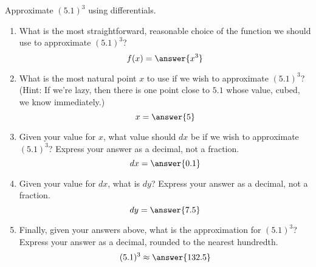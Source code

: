 \documentclass{ximera}
\author{Gregory Hartman \and Matthew Carr}
\begin{document}
\begin{exercise}




Approximate $(5.1)^3$ using differentials.
\begin{enumerate}
\item		What is the most straightforward, reasonable choice of the function we should use to approximate $(5.1)^3$?\[f(x)=\answer{x^3}\]
\item		What is the most natural point $x$ to use if we wish to approximate $(5.1)^3$? (Hint: If we're lazy, then there is one point close to $5.1$ whose value, cubed, we know immediately.) \[x=\answer{5}\]
\item		Given your value for $x$, what value should $dx$ be if we wish to approximate $(5.1)^3$? Express your answer as a decimal, not a fraction. \[dx=\answer{0.1}\]
\item		Given your value for $dx$, what is $dy$? Express your answer as a decimal, not a fraction. \[dy=\answer{7.5}\]
\item		Finally, given your answers above, what is the approximation for $(5.1)^3$? Express your answer as a decimal, rounded to the nearest hundredth. \[(5.1)^3\approx\answer{132.5}\]
\end{enumerate}


\end{exercise}
\end{document}
